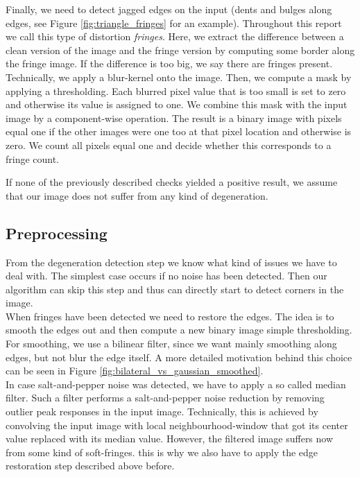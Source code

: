 \documentclass[conference]{IEEEtran}
\begin{document}
Finally, we need to detect jagged edges on the input (dents and bulges along edges, see Figure \ref{fig:triangle_fringes} for an example). 
Throughout this report we call this type of distortion \emph{fringes}. 
Here, we extract the difference between a clean version of the image and the fringe version by computing some border along the fringe image. 
If the difference is too big, we say there are fringes present. \\
	
Technically, we apply a blur-kernel onto the image. Then, we compute a mask by applying a thresholding. Each blurred pixel value that is too small is set to zero and otherwise its value is assigned to one. We combine this mask with the input image by a component-wise operation. The result is a binary image with pixels equal one if the other images were one too at that pixel location and otherwise is zero. We count all pixels equal one and decide whether this corresponds to a fringe count.
	
	

If none of the previously described checks yielded a positive result, we assume that our image does not suffer from any kind of degeneration.
  
\subsection{Preprocessing}
From the degeneration detection step we know what kind of issues we have to deal with. The simplest case occurs if no noise has been detected. Then our algorithm can skip this step and thus can directly start to detect corners in the image. \\

When fringes have been detected we need to restore the edges.
The idea is to smooth the edges out and then compute a new binary image simple thresholding. 
For smoothing, we use a bilinear filter\cite{TomasiBilateralFiltering}, since we want mainly smoothing along edges, but not blur the edge itself. A more detailed motivation behind this
choice can be seen in Figure \ref{fig:bilateral_vs_gaussian_smoothed}. \\

In case salt-and-pepper noise was detected, we have to apply a so called median filter. Such a filter performs a salt-and-pepper noise reduction by removing outlier peak responses in the input image. Technically, this is achieved by convolving the input image with local neighbourhood-window that got its center value replaced with its median value. However, the filtered image suffers now from some kind of soft-fringes. this is why we also have to apply the edge restoration step described above before. \\
\end{document}
